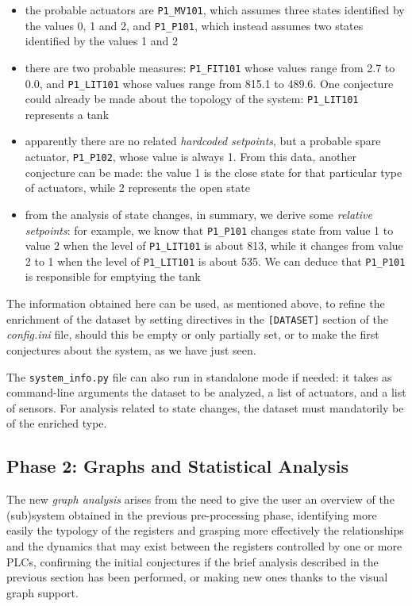 \begin{itemize}
	\item the probable actuators are \texttt{P1\_MV101}, which assumes three states identified by the values 0, 1 and 2, and \texttt{P1\_P101}, which instead assumes two states identified by the values 1 and 2
	
	\item there are two probable measures: \texttt{P1\_FIT101} whose values range from 2.7 to 0.0, and \texttt{P1\_LIT101} whose values range from 815.1 to 489.6. One conjecture could already be made about the topology of the system: \texttt{P1\_LIT101} represents a tank
		
	\item apparently there are no related \textit{hardcoded setpoints}, but a probable spare actuator, \texttt{P1\_P102}, whose value is always 1. From this data, another conjecture can be made: the value 1 is the close state for that particular type of actuators, while 2 represents the open state
	
	\item from the analysis of state changes, in summary, we derive some \textit{relative setpoints}: for example, we know that \texttt{P1\_P101} changes state from value 1 to value 2 when the level of \texttt{P1\_LIT101} is about 813, while it changes from value 2 to 1 when the level of \texttt{P1\_LIT101} is about 535. We can deduce that \texttt{P1\_P101} is responsible for emptying the tank	
\end{itemize}

The information obtained here can be used, as mentioned above, to refine the enrichment of the dataset by setting directives in the \texttt{[DATASET]} section of the \textit{config.ini} file, should this be empty or only partially set, or to make the first conjectures about the system, as we have just seen.

\bigskip
The \texttt{system\_info.py} file can also run in standalone mode if needed: it takes as command-line arguments the dataset to be analyzed, a list of actuators, and a list of sensors. For analysis related to state changes, the dataset must mandatorily be of the enriched type.

\subsection{Phase 2: Graphs and Statistical Analysis}
\label{subsec:improve_graphs}

The new \textit{graph analysis} arises from the need to give the user an overview of the (sub)system obtained in the previous pre-processing phase, identifying more easily the typology of the registers and grasping more effectively the relationships and the dynamics that may exist between the registers controlled by one or more PLCs, confirming the initial conjectures if the brief analysis described in the previous section has been performed, or making new ones thanks to the visual graph support. 

